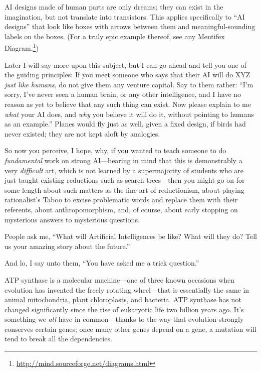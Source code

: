  AI designs made of human parts are only dreams; they can exist in
the imagination, but not translate into transistors. This applies
specifically to ``AI designs'' that
look like boxes with arrows between them and meaningful-sounding labels
on the boxes. (For a truly epic example thereof, see any Mentifex
Diagram.\footnote{\url{http://mind.sourceforge.net/diagrams.html}})


 Later I will say more upon this subject, but I can go ahead and
tell you one of the guiding principles: If you meet someone who says
that their AI will do XYZ \textit{just like humans}, do not give them
any venture capital. Say to them rather:
``I'm sorry, I've
never seen a human brain, or any other intelligence, and I have no
reason as yet to believe that any such thing can exist. Now please
explain to me \textit{what} your AI does, and \textit{why} you believe
it will do it, without pointing to humans as an
example.'' Planes would fly just as well, given a
fixed design, if birds had never existed; they are not kept aloft by
analogies.


 So now you perceive, I hope, why, if you wanted to teach someone
to do \textit{fundamental} work on strong AI---bearing in mind that
this is demonstrably a very \textit{difficult} art, which is not
learned by a supermajority of students who are just taught existing
reductions such as search trees---then you might go on for some length
about such matters as the fine art of reductionism, about playing
rationalist's Taboo to excise problematic words and
replace them with their referents, about anthropomorphism, and, of
course, about early stopping on mysterious answers to mysterious
questions.

\myendsectiontext


\bigskip



 People ask me, ``What will Artificial
Intelligences be like? What will they do? Tell us your amazing story
about the future.'' 


 And lo, I say unto them, ``You have asked me a
trick question.''


 ATP synthase is a molecular machine---one of three known occasions
when evolution has invented the freely rotating wheel---that is
essentially the same in animal mitochondria, plant chloroplasts, and
bacteria. ATP synthase has not changed significantly since the rise of
eukaryotic life two billion years ago. It's something
we \textit{all} have in common---thanks to the way that evolution
strongly conserves certain genes; once many other genes depend on a
gene, a mutation will tend to break all the dependencies.


